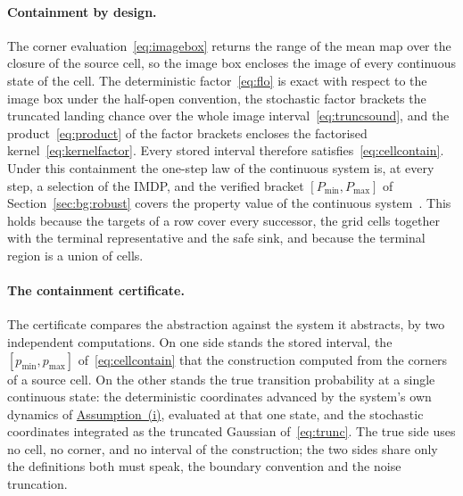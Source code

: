 \documentclass[11pt,a4paper]{article}
\theoremstyle{plain}
\theoremstyle{remark}
\begin{document}
	\paragraph{Containment by design.}
	The corner evaluation~\eqref{eq:imagebox} returns the range of the mean map over the closure of the source cell, so the image box encloses
	the image of every continuous state of the cell. The
	deterministic factor~\eqref{eq:flo} is exact with respect to the
	image box under the half-open convention, the stochastic factor
	brackets the truncated landing chance over the whole image
	interval~\eqref{eq:truncsound}, and the product~\eqref{eq:product}
	of the factor brackets encloses the factorised
	kernel~\eqref{eq:kernelfactor}. Every stored interval therefore
	satisfies~\eqref{eq:cellcontain}. Under this containment the one-step law of the continuous system is, at every step, a selection of the IMDP, and the verified bracket $[P_{\min}, P_{\max}]$ of Section~\ref{sec:bg:robust} covers the property value of the continuous system~\cite{LAB15}. This holds because the targets of a row cover every successor, the grid cells together with the terminal representative and the safe sink, and because the terminal region is a union of cells.
	
	\paragraph{The containment certificate.}
	The certificate compares the abstraction against the system it
	abstracts, by two independent computations. On one side stands
	the stored interval, the $[p_{\min}, p_{\max}]$
	of~\eqref{eq:cellcontain} that the construction computed from the
	corners of a source cell. On the other stands the true transition
	probability at a single continuous state: the deterministic
	coordinates advanced by the system's own dynamics
	of \hyperref[ass:sysclass]{Assumption~(i)}, evaluated at that one
	state, and the stochastic coordinates integrated as the truncated
	Gaussian of~\eqref{eq:trunc}. The true side uses no cell, no
	corner, and no interval of the construction; the two sides share
	only the definitions both must speak, the boundary convention and
	the noise truncation.
	
\end{document}
